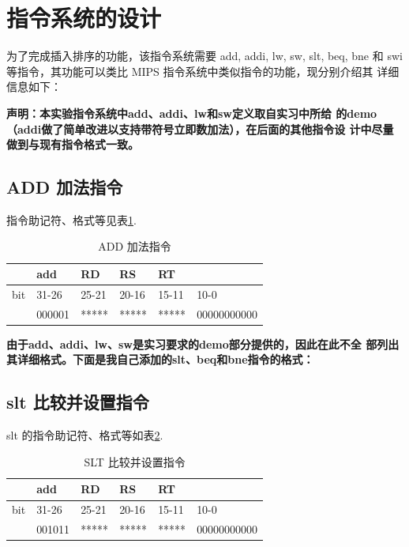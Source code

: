 \documentclass[a4paper,dvipdfm]{ctexart}
\begin{document}
\section{指令系统的设计}

为了完成插入排序的功能，该指令系统需要 add, addi, lw, sw, slt, beq, bne 和
swi 等指令，其功能可以类比 MIPS 指令系统中类似指令的功能，现分别介绍其
详细信息如下：

\textbf{声明：本实验指令系统中add、addi、lw和sw定义取自实习中所给
  的demo（addi做了简单改进以支持带符号立即数加法），在后面的其他指令设
  计中尽量做到与现有指令格式一致。}

\subsection{ADD 加法指令}
\label{sec:add-}

指令助记符、格式等见表\ref{tab:add}.

\begin{table}[hbt!]
  \centering
  \begin{tabular}{|l|l|l|l|l|l|}
    \hline
    &add&RD&RS&RT&\\
    \hline
    bit&31-26&25-21&20-16&15-11&10-0\\
    \hline
    &000001&*****&*****&*****&00000000000\\
    \hline
  \end{tabular}
  \caption{ADD 加法指令}
  \label{tab:add}
\end{table}

\textbf{由于add、addi、lw、sw是实习要求的demo部分提供的，因此在此不全
  部列出其详细格式。下面是我自己添加的slt、beq和bne指令的格式：}

\subsection{slt 比较并设置指令}
\label{sec:slt-}

slt 的指令助记符、格式等如表\ref{tab:slt}.

\begin{table}[hbt!]
  \centering
  \begin{tabular}{|l|l|l|l|l|l|}
    \hline
    &add&RD&RS&RT&\\
    \hline
    bit&31-26&25-21&20-16&15-11&10-0\\
    \hline
    &001011&*****&*****&*****&00000000000\\
    \hline
  \end{tabular}
  \caption{SLT 比较并设置指令}
  \label{tab:slt}
\end{table}
\end{document}
